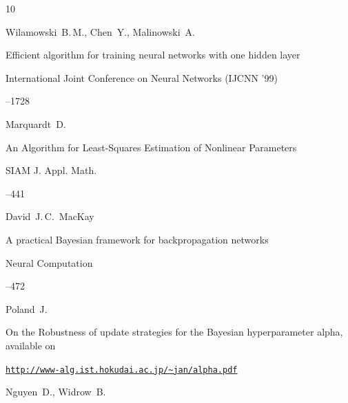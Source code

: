 \begin{thebibliography}{10}




\by Wilamowski~B.\,M., Chen~Y., Malinowski~A.

\paper Efficient algorithm for training neural networks with one hidden layer 

\inbook International Joint Conference on  Neural Networks (IJCNN '99) 



--1728





\by Marquardt~D.

\paper An Algorithm for Least-Squares Estimation of Nonlinear Parameters

\jour SIAM J. Appl. Math. 




--441




\by David~J.\,C.~MacKay

\paper A practical Bayesian framework for backpropagation networks

\jour Neural Computation




--472





\by Poland~J.

\preprint On the Robustness of update strategies for the Bayesian hyperparameter alpha, available on

\preprintinfo  \href{http://www-alg.ist.hokudai.ac.jp/~jan/alpha.pdf}{\tt http://www-alg.ist.hokudai.ac.jp/\~{}jan/alpha.pdf}







\by Nguyen~D., Widrow~B.


\end{thebibliography}
